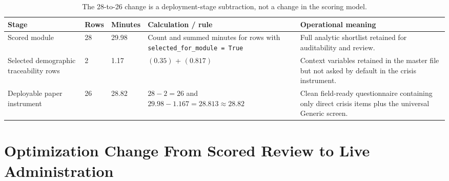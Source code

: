 \documentclass[12pt]{article}
\begin{document}
\begin{table}[H]
\centering
\footnotesize
\begin{tabularx}{\textwidth}{L{0.22\textwidth} R{0.08\textwidth} R{0.10\textwidth} Y Y}
\toprule
Stage & Rows & Minutes & Calculation / rule & Operational meaning \\
\midrule
Scored module & 28 & 29.98 & Count and summed minutes for rows with \texttt{selected\_for\_module = True} & Full analytic shortlist retained for auditability and review. \\
Selected demographic traceability rows & 2 & 1.17 &  $(0.35)$ +  $(0.817)$ & Context variables retained in the master file but not asked by default in the crisis instrument. \\
Deployable paper instrument & 26 & 28.82 & $28 - 2 = 26$ and $29.98 - 1.167 = 28.813 \approx 28.82$ & Clean field-ready questionnaire containing only direct crisis items plus the universal Generic screen. \\
\bottomrule
\end{tabularx}
\caption{The 28-to-26 change is a deployment-stage subtraction, not a change in the scoring model.}
\end{table}

\section{Optimization Change From Scored Review to Live Administration}
\end{document}
